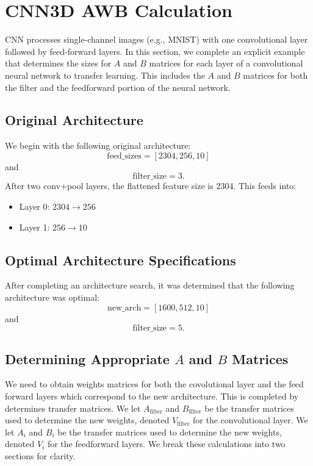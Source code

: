 \section{CNN3D AWB Calculation}\label{app: CNN3d AB}\label{app: CNN AB}
CNN processes single-channel images (e.g., MNIST) with one convolutional layer followed by feed-forward layers. In this section, we complete an explicit example that determines the sizes for $A$ and $B$ matrices for each layer of a convolutional neural network to transfer learning. This includes the $A$ and $B$ matrices for both the filter and the feedforward portion of the neural network.

\subsection{Original Architecture}
We begin with the following original architecture: 
\begin{equation}
\text{feed\_sizes} = [2304, 256, 10]
\end{equation}
and
\begin{equation}
    \text{filter\_size} = 3.
\end{equation}
After two conv+pool layers, the flattened feature size is 2304. This feeds into:
\begin{itemize}
    \item Layer 0: $2304 \rightarrow 256$
    \item Layer 1: $256 \rightarrow 10$
\end{itemize}

\subsection{Optimal Architecture Specifications}

After completing an architecture search, it was determined that the following architecture was optimal:
\begin{equation}
\text{new\_arch} = [1600, 512, 10]
\end{equation}
and
\begin{equation}
    \text{filter\_size} = 5.
\end{equation}

\subsection{Determining Appropriate $A$ and $B$ Matrices}
We need to obtain weights matrices for both the covolutional layer and the feed forward layers which correspond to the new architecture. This is completed by determines transfer matrices. We let $A_\text{filter}$ and $B_\text{filter}$ be the transfer matrices used to determine the new weights, denoted $V_\text{filter}$ for the convolutional layer. We let $A_i$ and $B_i$ be the transfer matrices used to determine the new weights, denoted $V_i$ for the feedforward layers. We break these calculations into two sections for clarity.\\


